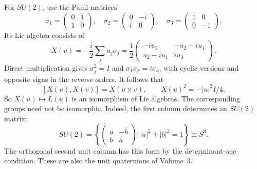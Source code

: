 For $SU(2)$, use the Pauli matrices
\[
 \sigma_1=\begin{pmatrix}0&1\\1&0\end{pmatrix},\quad
 \sigma_2=\begin{pmatrix}0&-i\\i&0\end{pmatrix},\quad
 \sigma_3=\begin{pmatrix}1&0\\0&-1\end{pmatrix}.
\]
Its Lie algebra consists of
\[
 X(u)=-\frac i2\sum_j u_j\sigma_j
 =\frac12\begin{pmatrix}-iu_3&-u_2-iu_1\\u_2-iu_1&iu_3\end{pmatrix}.
\]
Direct multiplication gives $\sigma_j^2=I$ and
$\sigma_1\sigma_2=i\sigma_3$, with cyclic versions and opposite signs
in the reverse orders. It follows that
\[
 [X(u),X(v)]=X(u\times v),\qquad X(u)^2=-|u|^2I/4.
\]
So $X(u)\mapsto L(u)$ is an isomorphism of Lie algebras.
The corresponding groups need not be isomorphic.
Indeed, the first column determines an $SU(2)$ matrix:
\[
 SU(2)=\left\{\begin{pmatrix}a&-\overline b\\b&\overline a\end{pmatrix}:
 |a|^2+|b|^2=1\right\}\cong S^3.
\]
The orthogonal second unit column has this form by the determinant-one
condition. These are also the unit quaternions of Volume~3.

